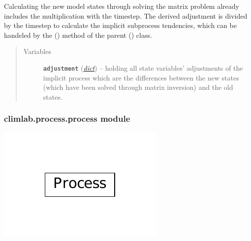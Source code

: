 \documentclass[a4paper,10pt,english]{sphinxmanual}
\begin{document}
\begin{fulllineitems}
\begin{fulllineitems}
Calculating the new model states through solving the matrix problem 
already includes the multiplication with the timestep. The derived 
adjustment is divided by the timestep to calculate the implicit 
subprocess tendencies, which can be handeled by the 
{\hyperref[api/climlab.process:climlab.process.time_dependent_process.TimeDependentProcess.compute]{\emph{}}} ()
method of the parent 
{\hyperref[api/climlab.process:climlab.process.time_dependent_process.TimeDependentProcess]{\emph{}}} () class.
\begin{quote}\begin{description}
\item[{Variables}] \leavevmode
\textbf{\texttt{adjustment}} (\href{http://docs.python.org/2.7/library/stdtypes.html\#dict}{\emph{dict}}) -- holding all state variables' adjustments
of the implicit process which are the 
differences between the new states (which have 
been solved through matrix inversion) and the 
old states.

\end{description}\end{quote}

\end{fulllineitems}


\end{fulllineitems}



\subsubsection{climlab.process.process module}
\label{api/climlab.process:climlab-process-process-module}
\includegraphics{inheritance-8eb24c41e1d3c85885c11e2e65fb208089ce0aa8.pdf}
\label{api/climlab.process:module-climlab.process.process}
\end{document}

